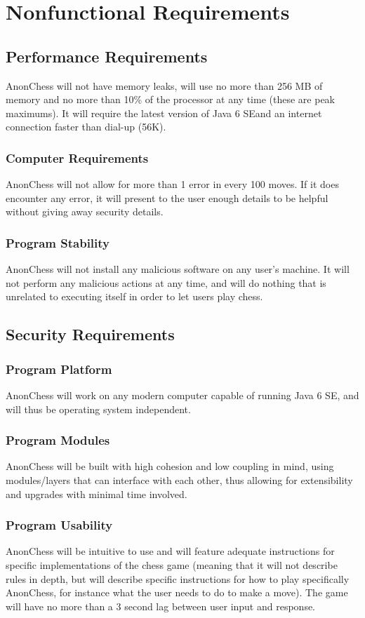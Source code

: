 \section{Nonfunctional Requirements}
\subsection{Performance Requirements}
AnonChess will not have memory leaks, will use no more than 256 MB of memory and no more than 10\% of the processor 
at any time (these are peak maximums). It will require the latest version of Java 6 SEand an internet connection faster 
than dial-up (56K).
\subsubsection{Computer Requirements}
AnonChess will not allow for more than 1 error in every 100 moves. If it does encounter any error, it will present 
to the user enough details to be helpful without giving away security details.
\subsubsection{Program Stability}
AnonChess will not install any malicious software on any user's machine. It will not perform any malicious actions 
at any time, and will do nothing that is unrelated to executing itself in order to let users play chess.
\subsection{Security Requirements}
\subsubsection{Program Platform}
AnonChess will work on any modern computer capable of running Java 6 SE, and will thus be operating 
system independent.
\subsubsection{Program Modules}
AnonChess will be built with high cohesion and low coupling in mind, using modules/layers that can interface with 
each other, thus allowing for extensibility and upgrades with minimal time involved.
\subsubsection{Program Usability}
AnonChess will be intuitive to use and will feature adequate instructions for specific implementations of the chess 
game (meaning that it will not describe rules in depth, but will describe specific instructions for how to play 
specifically AnonChess, for instance what the user needs to do to make a move). The game will have no more than a 3 
second lag between user input and response.

